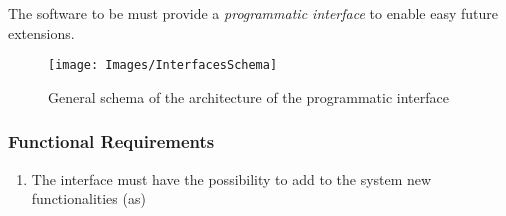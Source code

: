 The software to be must provide a \textit{programmatic interface} to enable easy future extensions.

\begin{figure}[H]
\centering
\texttt{[image: Images/InterfacesSchema]}
\caption{General schema of the architecture of the programmatic interface}
\end{figure}

\subsubsection{Functional Requirements}
\begin{enumerate}
\item The interface must have the possibility to add to the system new functionalities (as)
\end{enumerate}